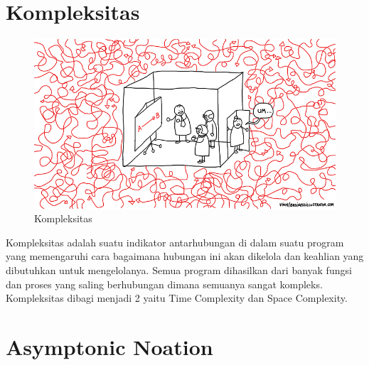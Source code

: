 \section{Kompleksitas}
\begin{figure}[H]
        \centerline{\includegraphics[scale=0.35]{figures/algoritma-kompleksitas/kompleksitas}}
        \caption{Kompleksitas}
\end{figure}
Kompleksitas adalah suatu indikator antarhubungan di dalam suatu program yang memengaruhi cara bagaimana hubungan ini akan dikelola dan keahlian yang dibutuhkan untuk mengelolanya. Semua program dihasilkan dari banyak fungsi dan proses yang saling berhubungan dimana semuanya sangat kompleks. Kompleksitas dibagi menjadi 2 yaitu Time Complexity dan Space Complexity.

\section{Asymptonic Noation}


